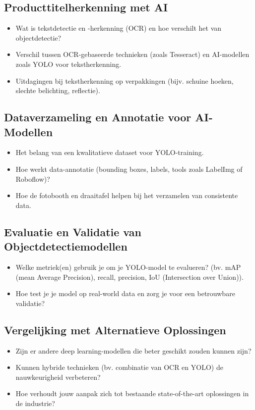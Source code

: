 \subsection{Producttitelherkenning met AI}
\begin{itemize}
    \item Wat is tekstdetectie en -herkenning (OCR) en hoe verschilt het van objectdetectie?
    \item Verschil tussen OCR-gebaseerde technieken (zoals Tesseract) en AI-modellen zoals YOLO voor tekstherkenning.
    \item Uitdagingen bij tekstherkenning op verpakkingen (bijv. schuine hoeken, slechte belichting, reflectie).
\end{itemize}

\subsection{Dataverzameling en Annotatie voor AI-Modellen}
\begin{itemize}
    \item Het belang van een kwalitatieve dataset voor YOLO-training.
    \item Hoe werkt data-annotatie (bounding boxes, labels, tools zoals LabelImg of Roboflow)?
    \item Hoe de fotobooth en draaitafel helpen bij het verzamelen van consistente data.
\end{itemize}

\subsection{Evaluatie en Validatie van Objectdetectiemodellen}
\begin{itemize}
    \item Welke metriek(en) gebruik je om je YOLO-model te evalueren? (bv. mAP (mean Average Precision), recall, precision, IoU (Intersection over Union)).
    \item Hoe test je je model op real-world data en zorg je voor een betrouwbare validatie?
\end{itemize}

\subsection{Vergelijking met Alternatieve Oplossingen}
\begin{itemize}
    \item Zijn er andere deep learning-modellen die beter geschikt zouden kunnen zijn?
    \item Kunnen hybride technieken (bv. combinatie van OCR en YOLO) de nauwkeurigheid verbeteren?
    \item Hoe verhoudt jouw aanpak zich tot bestaande state-of-the-art oplossingen in de industrie?
\end{itemize}


